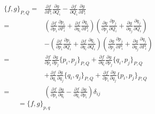 \begin{align*}
    \{f,g\}_{P,Q}
    =&\frac{\partial f}{\partial P_i}\frac{\partial g}{\partial Q_i}
    -\frac{\partial f}{\partial Q_i}\frac{\partial g}{\partial P_i}\\
    =&\left(\frac{\partial f}{\partial p_i}\frac{\partial p_i}{\partial P_i}
    +\frac{\partial f}{\partial q_i}\frac{\partial q_i}{\partial P_i}\right)
    \left(\frac{\partial g}{\partial p_j}\frac{\partial p_j}{\partial Q_i}
    +\frac{\partial g}{\partial q_j}\frac{\partial q_j}{\partial Q_i}\right)\\
    &-\left(\frac{\partial f}{\partial p_i}\frac{\partial p_i}{\partial Q_i}
    +\frac{\partial f}{\partial q_i}\frac{\partial q_i}{\partial Q_i}\right)
    \left(\frac{\partial g}{\partial p_j}\frac{\partial p_j}{\partial P_i}
    +\frac{\partial g}{\partial q_j}\frac{\partial q_j}{\partial P_i}\right)\\
    =&\frac{\partial f}{\partial p_i}\frac{\partial g}{\partial p_j}\{p_i,p_j\}_{P,Q}
    +\frac{\partial f}{\partial q_i}\frac{\partial g}{\partial p_j}\{q_i,p_j\}_{P,Q}\\
    &+\frac{\partial f}{\partial q_i}\frac{\partial g}{\partial q_j}\{q_i,q_j\}_{P,Q}
    +\frac{\partial f}{\partial p_i}\frac{\partial g}{\partial q_j}\{p_i,p_j\}_{P,Q}\\
    =&\left(\frac{\partial f}{\partial p_i}\frac{\partial g}{\partial q_i}
    -\frac{\partial f}{\partial q_i}\frac{\partial g}{\partial p_i}\right)\delta_{ij}
\end{align*}
\begin{equation}
    =\{f,g\}_{p,q}\qquad\qquad\qquad\qquad\qquad\qquad\quad
\end{equation}
